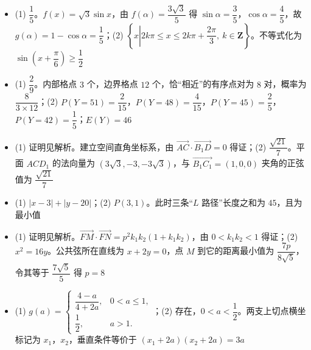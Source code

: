 \begin{itemize}[leftmargin=2.6em]
  \item[\textbf{17.}] (1) $\dfrac15$。$f(x)=\sqrt3\sin x$，由 $f(\alpha)=\dfrac{3\sqrt3}{5}$ 得 $\sin\alpha=\dfrac35$，$\cos\alpha=\dfrac45$，故 $g(\alpha)=1-\cos\alpha=\dfrac15$；(2) $\left\{x\left|2k\pi\leqslant x\leqslant2k\pi+\dfrac{2\pi}{3},\ k\in\mathbf Z\right.\right\}$。不等式化为 $\sin\left(x+\dfrac\pi6\right)\geqslant\dfrac12$
  \item[\textbf{18.}] (1) $\dfrac29$。内部格点 $3$ 个，边界格点 $12$ 个，恰“相近”的有序点对为 $8$ 对，概率为 $\dfrac8{3\times12}$；(2) $P(Y=51)=\dfrac2{15}$，$P(Y=48)=\dfrac4{15}$，$P(Y=45)=\dfrac25$，$P(Y=42)=\dfrac15$；$E(Y)=46$
  \item[\textbf{19.}] (1) 证明见解析。建立空间直角坐标系，由 $\overrightarrow{AC}\cdot\overrightarrow{B_1D}=0$ 得证；(2) $\dfrac{\sqrt{21}}7$。平面 $ACD_1$ 的法向量为 $(3\sqrt3,-3,-3\sqrt3)$，与 $\overrightarrow{B_1C_1}=(1,0,0)$ 夹角的正弦值为 $\dfrac{\sqrt{21}}7$
  \item[\textbf{20.}] (1) $|x-3|+|y-20|$；(2) $P(3,1)$。此时三条“$L$ 路径”长度之和为 $45$，且为最小值
  \item[\textbf{21.}] (1) 证明见解析。$\overrightarrow{FM}\cdot\overrightarrow{FN}=p^2k_1k_2(1+k_1k_2)$，由 $0<k_1k_2<1$ 得证；(2) $x^2=16y$。公共弦所在直线为 $x+2y=0$，点 $M$ 到它的距离最小值为 $\dfrac{7p}{8\sqrt5}$，令其等于 $\dfrac{7\sqrt5}{5}$ 得 $p=8$
  \item[\textbf{22.}] (1) $g(a)=\begin{cases}\dfrac{4-a}{4+2a},&0<a\leqslant1,\\[2mm]\dfrac12,&a>1.\end{cases}$；(2) 存在，$0<a<\dfrac12$。两支上切点横坐标记为 $x_1$，$x_2$，垂直条件等价于 $(x_1+2a)(x_2+2a)=3a$
\end{itemize}
